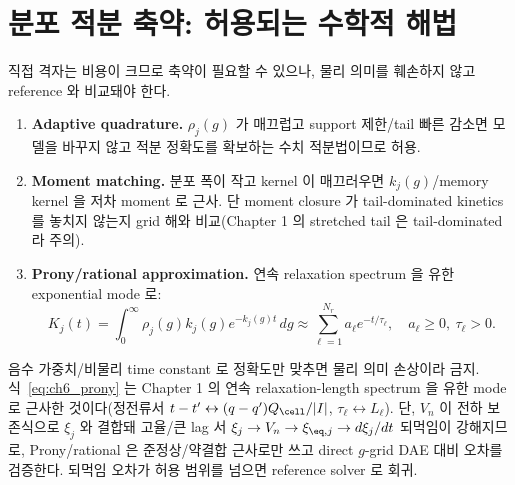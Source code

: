 \section{분포 적분 축약: 허용되는 수학적 해법}\label{sec:ch6_reduction}
직접 격자는 비용이 크므로 축약이 필요할 수 있으나, 물리 의미를 훼손하지 않고 reference 와 비교돼야 한다.
\begin{enumerate}[label=\textbf{(\alph*)},leftmargin=2.4em]
\item \textbf{Adaptive quadrature.} $\rho_j(g)$ 가 매끄럽고 support 제한/tail 빠른 감소면 모델을 바꾸지 않고
  적분 정확도를 확보하는 수치 적분법이므로 허용.
\item \textbf{Moment matching.} 분포 폭이 작고 kernel 이 매끄러우면 $k_j(g)$/memory kernel 을 저차 moment 로
  근사. 단 moment closure 가 tail-dominated kinetics 를 놓치지 않는지 grid 해와 비교(Chapter 1 의 stretched
  tail 은 tail-dominated 라 주의).
\item \textbf{Prony/rational approximation.} 연속 relaxation spectrum 을 유한 exponential mode 로:
\begin{equation}
K_j(t)=\int_0^\infty\rho_j(g)k_j(g)e^{-k_j(g)t}\,dg\approx\sum_{\ell=1}^{N_r}a_\ell e^{-t/\tau_\ell},\quad a_\ell\ge0,\ \tau_\ell>0.
\label{eq:ch6_prony}
\end{equation}
\end{enumerate}
음수 가중치/비물리 time constant 로 정확도만 맞추면 물리 의미 손상이라 금지. 식~\eqref{eq:ch6_prony} 는
Chapter 1 의 연속 relaxation-length spectrum 을 유한 mode 로 근사한 것이다(정전류서 $t-t'\leftrightarrow
(q-q')Q_\cell/|I|$, $\tau_\ell\leftrightarrow L_\ell$). 단, $V_n$ 이 전하 보존식으로 $\xi_j$ 와 결합돼
고율/큰 lag 서 $\xi_j\to V_n\to\xi_{\eq,j}\to d\xi_j/dt$ 되먹임이 강해지므로, Prony/rational 은 준정상/약결합
근사로만 쓰고 direct $g$-grid DAE 대비 오차를 검증한다. 되먹임 오차가 허용 범위를 넘으면 reference solver 로 회귀.


